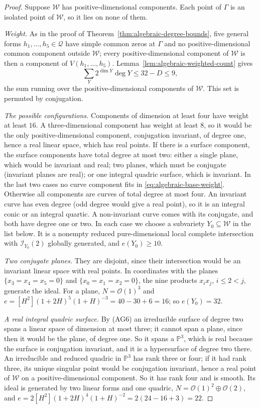\begin{proof}
Suppose $\mathcal W$ has positive-dimensional components. Each point of
$\Gamma$ is an isolated point of $\mathcal W$, so it lies on none of them.

\emph{Weight.} As in the proof of Theorem~\ref{thm:algebraic-degree-bounds},
five general forms $h_1,\ldots,h_5\in\mathcal Q$ have simple common zeros at
$\Gamma$ and no positive-dimensional common component outside $\mathcal W$;
every positive-dimensional component of $\mathcal W$ is then a component of
$V(h_1,\ldots,h_5)$. Lemma~\ref{lem:algebraic-weighted-count} gives
\begin{equation}
 \sum_{Y}2^{\dim Y}\deg Y\le32-D\le9,
 \label{eq:algebraic-base-weight}
\end{equation}
the sum running over the positive-dimensional components of $\mathcal W$.
This set is permuted by conjugation.

\emph{The possible configurations.} Components of dimension at least four
have weight at least $16$. A three-dimensional component has weight at least
$8$, so it would be the only positive-dimensional component, conjugation
invariant, of degree one, hence a real linear space, which has real points.
If there is a surface component, the surface components have total degree at
most two: either a single plane, which would be invariant and real; two
planes, which must be conjugate (invariant planes are real); or one integral
quadric surface, which is invariant. In the last two cases no curve component
fits in \eqref{eq:algebraic-base-weight}. Otherwise all components are curves of total
degree at most four. An invariant curve has even degree (odd degree would give
a real point), so it is an integral conic or an integral quartic. A
non-invariant curve comes with its conjugate, and both have degree one or two.
In each case we choose a subvariety $Y_0\subseteq\mathcal W$ in the list below.
It is a nonempty reduced pure-dimensional local complete intersection with
$\mathcal I_{Y_0}(2)$ globally generated, and $e(Y_0)\ge10$.

\emph{Two conjugate planes.} They are disjoint, since their intersection
would be an invariant linear space with real points. In coordinates with the
planes $\{x_3=x_4=x_5=0\}$ and $\{x_0=x_1=x_2=0\}$, the nine products
$x_ix_j$, $i\le2<j$, generate the ideal. For a plane, $N=\mathcal O(1)^3$ and
$e=[H^2](1+2H)^5(1+H)^{-3}=40-30+6=16$; so $e(Y_0)=32$.

\emph{A real integral quadric surface.} By (AG6) an irreducible surface of
degree two spans a linear space of dimension at most three; it cannot span a
plane, since then it would be the plane, of degree one. So it spans a
$\mathbb P^3$, which is real because the surface is conjugation invariant, and
it is a hypersurface of degree two there. An irreducible and reduced quadric in
$\mathbb P^3$ has rank three or four; if it had rank three, its unique
singular point would be conjugation invariant, hence a real point of
$\mathcal W$ on a positive-dimensional component. So it has rank four and is
smooth. Its ideal is generated by two linear forms and
one quadric, $N=\mathcal O(1)^2\oplus\mathcal O(2)$, and
$e=2[H^2](1+2H)^4(1+H)^{-2}=2(24-16+3)=22$.


\end{proof}
